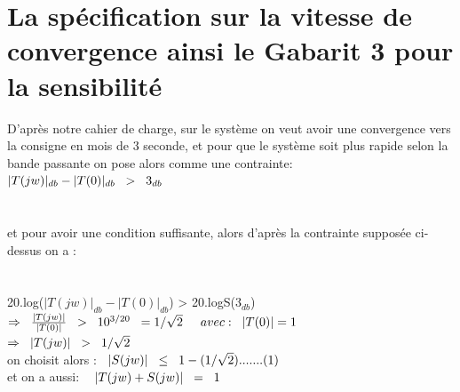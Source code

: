 \documentclass[12pt, a4paper, openany]{report}
\begin{document}
\section{La spécification sur la vitesse de convergence ainsi le Gabarit 3 pour la sensibilité}  %

D'après notre cahier de charge, sur le système on veut avoir une convergence vers la consigne en mois de 3 seconde, et pour que le système soit plus rapide selon la bande passante on pose alors comme une contrainte:\\
 $|T(jw)|_{db}-|T(0)|_{db} \hspace{0.2cm} > \hspace{0.2cm} 3_{db}$\\ 
 \\[0.07cm]\\
 et pour avoir une condition suffisante, alors d'après la contrainte supposée ci-dessus on a :\\
 \\[1mm]\\
 20.log($|T(jw)|_{db}-|T(0)|_{db}$) \hspace{0.2cm} > \hspace{0.2cm} 20.logS($3_{db}$)\\
 
$\Rightarrow\hspace{0.2cm} \frac {|T(jw)|}{|T(0)|} \hspace{0.2cm} > \hspace{0.2cm} 10^{3/20} \hspace{0.2cm}=1/\sqrt{2} \hspace{0.5cm} avec : \hspace{0.2cm} |T(0)|=1$ \\

$\Rightarrow\hspace{0.2cm} |T(jw)| \hspace{0.2cm} > \hspace{0.2cm} 1/\sqrt{2}$ \\

on choisit alors :$\hspace{0.3cm} |S(jw)|\hspace{0.2cm}\leq \hspace{0.2cm} 1-(1/\sqrt{2}).......(1)$ \\
 
et on a aussi: $\hspace{0.3cm} |T(jw)+S(jw)|\hspace{0.2cm}= \hspace{0.2cm} 1$\\
\end{document}
